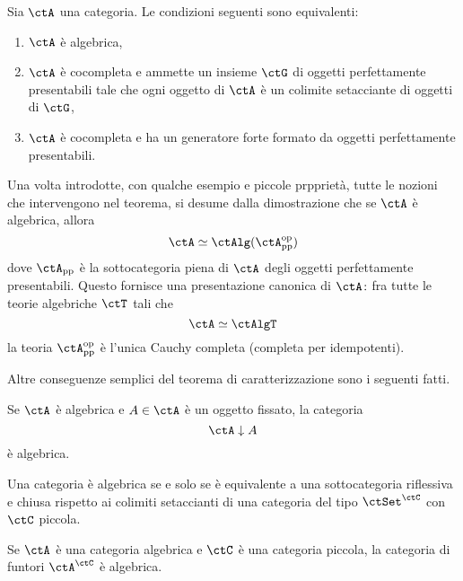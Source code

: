 \begin{theorem}\label{teo_caract_AlgT}
Sia $\ctA$ una categoria. Le condizioni seguenti sono equivalenti:
\begin{enumerate}
\item $\ctA$ è algebrica,
\item $\ctA$ è cocompleta e ammette un insieme $\ctG$ di oggetti perfettamente presentabili tale che ogni 
oggetto di $\ctA$ è un colimite setacciante di oggetti di $\ctG$,
\item $\ctA$ è cocompleta e ha un generatore forte formato da oggetti perfettamente presentabili.
\end{enumerate}
\end{theorem}

\begin{remark}\label{oss_pres_can}
Una volta introdotte, con qualche esempio e piccole prpprietà, tutte le nozioni che intervengono nel teorema, si desume 
dalla dimostrazione che se $\ctA$ è algebrica, allora 
\[
  \ctA \simeq \ctAlg(\ctA_{\mathrm{pp}}^{\mathrm{op}}) 
\]
dove $\ctA_{\mathrm{pp}}$ è la sottocategoria piena di $\ctA$ degli oggetti perfettamente presentabili. Questo fornisce
una presentazione canonica di $\ctA \colon$fra tutte le teorie algebriche $\ctT$ tali che
\[
  \ctA \simeq \ctAlgT 
\]
la teoria $\ctA_{\mathrm{pp}}^{\mathrm{op}}$ è l'unica Cauchy completa (completa per idempotenti).
\end{remark}

Altre conseguenze semplici del teorema di caratterizzazione sono i seguenti fatti.

\begin{proposition}\label{prop_comma_alg}
Se $\ctA$ è algebrica e $A \in \ctA$ è un oggetto fissato, la categoria 
\[
  \ctA \downarrow A 
\]
è algebrica.
\end{proposition} 

\begin{proposition}\label{prop_repr_aAlgT}
Una categoria è algebrica se e solo se è equivalente a una sottocategoria riflessiva e chiusa rispetto ai colimiti setaccianti
di una categoria del tipo $\ctSet^{\ctC}$ con $\ctC$ piccola.
\end{proposition} 

\begin{proposition}\label{prop_stab_alg_exp}
Se $\ctA$ è una categoria algebrica e $\ctC$ è una categoria piccola, la categoria di funtori $\ctA^{\ctC}$ è algebrica.
\end{proposition}

